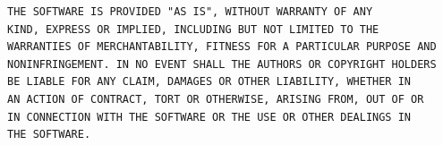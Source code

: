 \documentclass[mingoth,a4paper]{jsarticle}
\begin{document}
{{{{{{{\begin{multicols}{2}
\begin{fontsize}{6}{6}
\begin{verbatim}
THE SOFTWARE IS PROVIDED "AS IS", WITHOUT WARRANTY OF ANY
KIND, EXPRESS OR IMPLIED, INCLUDING BUT NOT LIMITED TO THE
WARRANTIES OF MERCHANTABILITY, FITNESS FOR A PARTICULAR PURPOSE AND
NONINFRINGEMENT. IN NO EVENT SHALL THE AUTHORS OR COPYRIGHT HOLDERS
BE LIABLE FOR ANY CLAIM, DAMAGES OR OTHER LIABILITY, WHETHER IN
AN ACTION OF CONTRACT, TORT OR OTHERWISE, ARISING FROM, OUT OF OR
IN CONNECTION WITH THE SOFTWARE OR THE USE OR OTHER DEALINGS IN
THE SOFTWARE.
 \end{verbatim}
 \end{fontsize}
\end{multicols}


}}}}}}}
\end{document}
